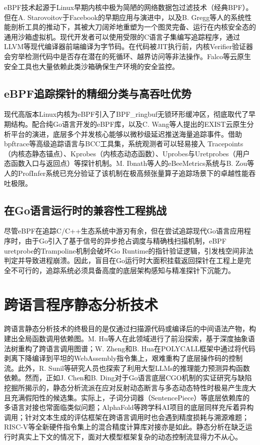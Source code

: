 eBPF技术起源于Linux早期内核中极为简陋的网络数据包过滤技术（经典BPF）。但在A. Starovoitov于Facebook的早期应用与演进中，以及B. Gregg等人的系统性能剖析工具的推动下，其被大刀阔斧地重塑为一个图灵完备、运行在内核安全态的通用沙箱虚拟机。现代开发者可以使用受限的C语言子集编写追踪程序，通过LLVM等现代编译器前端编译为字节码。在代码被JIT执行前，内核Verifier验证器会穷举检测代码中是否存在潜在的死循环、越界访问等非法操作。Falco等云原生安全工具也大量依赖此类沙箱确保生产环境的安全监控。

\subsection{eBPF追踪探针的精细分类与高吞吐优势}

现代高版本Linux内核为eBPF引入了BPF\_ringbuf无锁环形缓冲区，彻底取代了早期结构。配合纯Go语言开发的eBPF库，以及C. Wang等人提出的EXIST云原生分析平台的演进，底层多个并发核心能够以微秒级延迟推送海量追踪事件。借助bpftrace等高级追踪语言与BCC工具集，系统观测者可以轻易接入 Tracepoints（内核态静态锚点）、Kprobes（内核态动态函数）、Uprobes与Uretprobes（用户态函数入口与返回点）等探针机制。M. Ibnath等人的eBeeMetrics系统与B. Zou等人的ProfInfer系统已充分验证了该机制在极高频张量算子追踪场景下的卓越性能吞吐极限。

\subsection{在Go语言运行时的兼容性工程挑战}

尽管eBPF在追踪C/C++生态系统中游刃有余，但在尝试追踪现代Go语言应用程序时，由于Go引入了基于信号的异步抢占调度与精确栈扫描机制，eBPF uretprobe的Trampoline机制会破坏Go Runtime的指针验证逻辑，引发栈空间非法判定并导致进程崩溃。因此，盲目在Go运行时大面积挂载返回探针在工程上是完全不可行的，追踪系统必须具备高度的底层架构感知与精准探针下沉能力。

\section{跨语言程序静态分析技术}

跨语言静态分析技术的终极目的是仅通过扫描源代码或编译后的中间语法产物，构建出全局函数调用依赖图。M. Hu等人在此领域进行了前沿探索，基于深度抽象语法树重构了跨语言调用图谱；W. Zheng和B. Hua在POLYCALL框架中通过将代码剥离下降编译到平坦的WebAssembly指令集上，艰难重构了底层操作码的控制流。此外，R. Sunil等研究人员也探索了利用大型LLMs的推理能力预测异构函数依赖。然而，正如J. Chen和B. Ding对于Go语言底层CGO机制的实证研究与缺陷挖掘所揭示的，静态分析流派在应对反射动态断言与多态动态特性时极易产生庞大且充满假阳性的候选集。实际上，子词分词器（SentencePiece）等底层依赖库的多语言对接也常面临类似问题；AlphaFold等跨学科AI项目的底层同样充斥着异构调用；针对文本生成的评估框架在跨语言调用时也会遇到精度损耗与溯源难题；RISC-V等全新硬件指令集上的混合精度计算库对接亦是如此。静态分析在缺乏运行时真实上下文的情况下，面对大模型框架复杂的动态控制流显得力不从心。

